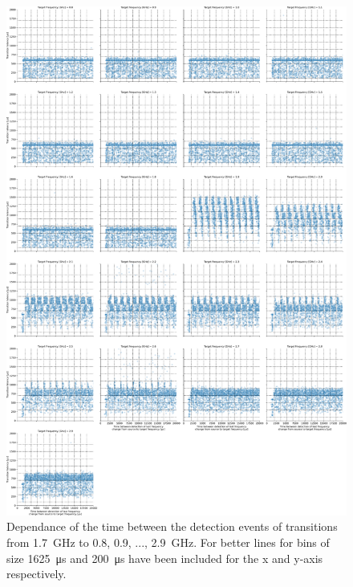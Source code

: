 \begin{figure}[]
    \centering
    \includegraphics[width=\columnwidth]{fig/ftalat_scatter_wait_transition_latency_hati_source_1.7.pdf}
    \caption{Dependance of the time between the detection events of transitions from \SI{1.7}{\GHz} to \SI{0.8}{}, \SI{0.9}{}, ..., \SI{2.9}{\GHz}. For better lines for bins of size \SI{1625}{\us} and \SI{200}{\us} have been included for the x and y-axis respectively.}
\end{figure}
